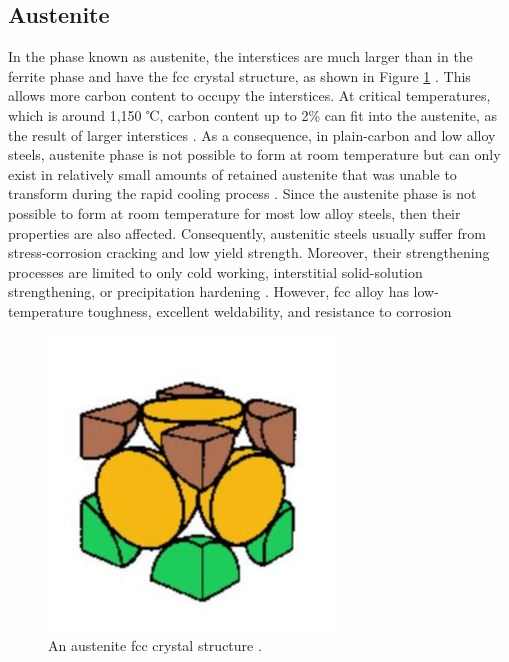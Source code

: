 \documentclass[12pt]{report}
\begin{document}
\subsection{Austenite} 
In the phase known as austenite, the interstices are much larger than in the ferrite phase and have the fcc crystal structure, as shown in Figure \ref{ch3:figure:austenite} \cite{bajaj2020steels}. This allows more carbon content to occupy the interstices. At critical temperatures, which is around 1,150 ℃, carbon content up to 2\% can fit into the austenite, as the result of larger interstices \cite{bhadeshia2017steels}. As a consequence, in plain-carbon and low alloy steels, austenite phase is not possible to form at room temperature but can only exist in relatively small amounts of retained austenite that was unable to transform during the rapid cooling process \cite{molabe2018determining}.
Since the austenite phase is not possible to form at room temperature for most low alloy steels, then their properties are also affected. Consequently, austenitic steels usually suffer from stress-corrosion cracking and low yield strength. Moreover, their strengthening processes are limited to only cold working, interstitial solid-solution strengthening, or precipitation hardening \cite{molabe2018determining}. However, fcc alloy has low-temperature toughness, excellent weldability, and resistance to corrosion \cite{bhadeshia2017steels}
 
\begin{figure}[H]
    \centering
    \includegraphics[width=.45\textwidth]{austenite_fcc_crystal_structure.jpg}
    \caption{An austenite fcc crystal structure \cite{bajaj2020steels}.}
    \label{ch3:figure:austenite}
\end{figure}
\end{document}
